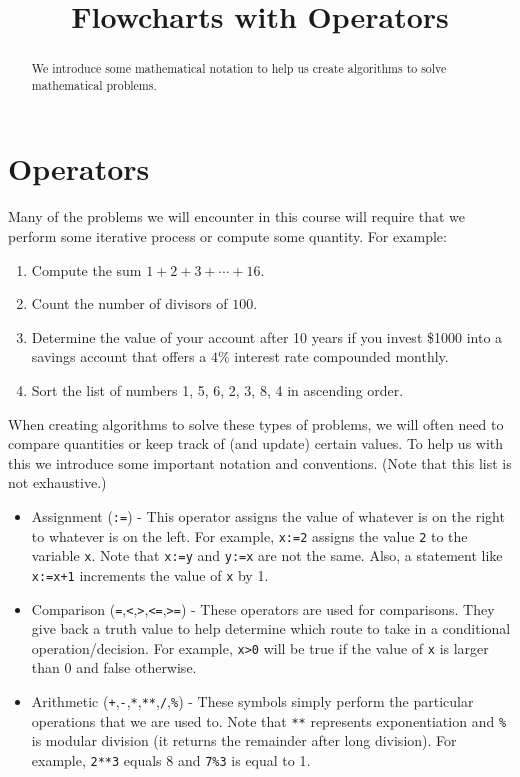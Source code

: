 \documentclass{ximera}
\title{Flowcharts with Operators}
\begin{document}
  
\begin{abstract}  
We introduce some mathematical notation to help us create algorithms to solve mathematical problems. 
\end{abstract}  
\maketitle

\section{Operators}
Many of the problems we will encounter in this course will require that we perform some iterative process or compute some quantity. For example:

\begin{enumerate}
	\item Compute the sum $1+2+3+\cdots+16$.
	\item Count the number of divisors of $100$.
	\item Determine the value of your account after 10 years if you invest \$1000 into a savings account that offers a $4$\% interest rate compounded monthly.
	\item Sort the list of numbers 1, 5, 6, 2, 3, 8, 4 in ascending order.
\end{enumerate}

When creating algorithms to solve these types of problems, we will often need to compare quantities or keep track of (and update) certain values. To help us with this we introduce some important notation and conventions. (Note that this list is not exhaustive.)

\begin{itemize}
	\item Assignment (\verb|:=|) - This operator assigns the value of whatever is on the right to whatever is on the left. For example, \verb|x:=2| assigns the value \verb|2| to the variable \verb|x|. Note that \verb|x:=y| and \verb|y:=x| are not the same. Also, a statement like \verb|x:=x+1| increments the value of \verb|x| by 1.
	\item Comparison (\verb|=|,\verb|<|,\verb|>|,\verb|<=|,\verb|>=|) - These operators are used for comparisons. They give back a truth value to help determine which route to take in a conditional operation/decision. For example, \verb|x>0| will be true if the value of \verb|x| is larger than 0 and false otherwise.
		\item Arithmetic (\verb|+|,\verb|-|,\verb|*|,\verb|**|,\verb|/|,\verb|%|) - These symbols simply perform the particular operations that we are used to. Note that \verb|**| represents exponentiation and \verb|%| is modular division (it returns the remainder after long division). For example, \verb|2**3| equals 8 and \verb|7%3| is equal to 1.
\end{itemize}
\end{document}
